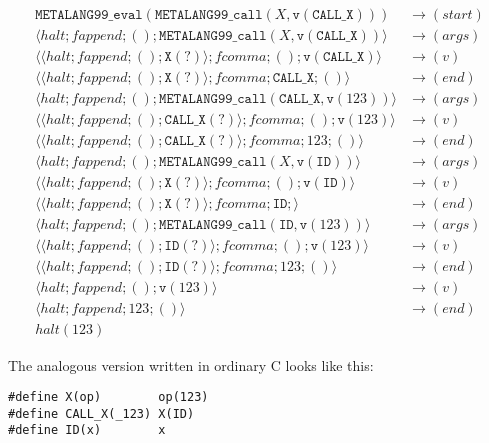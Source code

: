 \documentclass[12pt]{article}
\theoremstyle{break}
\begin{document}
\begin{example}
\begin{align*}
    \texttt{METALANG99\_eval}(\texttt{METALANG99\_call}(X, \texttt{v}(\texttt{CALL\_X}))) & \to (start) \\
    \langle halt; fappend; (); \texttt{METALANG99\_call}(X, \texttt{v}(\texttt{CALL\_X})) \rangle & \to (args) \\
    \langle \langle halt; fappend; (); \texttt{X}(?) \rangle; fcomma; (); \texttt{v}(\texttt{CALL\_X}) \rangle & \to (v) \\
    \langle \langle halt; fappend; (); \texttt{X}(?) \rangle; fcomma; \texttt{CALL\_X}; () \rangle & \to (end) \\
    \langle halt; fappend; (); \texttt{METALANG99\_call}(\texttt{CALL\_X}, \texttt{v}(123)) \rangle & \to (args) \\
    \langle \langle halt; fappend; (); \texttt{CALL\_X}(?) \rangle; fcomma; (); \texttt{v}(123) \rangle & \to (v) \\
    \langle \langle halt; fappend; (); \texttt{CALL\_X}(?) \rangle; fcomma; 123; () \rangle & \to (end) \\
    \langle halt; fappend; (); \texttt{METALANG99\_call}(X, \texttt{v}(\texttt{ID})) \rangle & \to (args) \\
    \langle \langle halt; fappend; (); \texttt{X}(?) \rangle; fcomma; (); \texttt{v}(\texttt{ID}) \rangle & \to (v) \\
    \langle \langle halt; fappend; (); \texttt{X}(?) \rangle; fcomma; \texttt{ID}; \rangle & \to (end) \\
    \langle halt; fappend; (); \texttt{METALANG99\_call}(\texttt{ID}, \texttt{v}(123)) \rangle & \to (args) \\
    \langle \langle halt; fappend; (); \texttt{ID}(?) \rangle; fcomma; (); \texttt{v}(123) \rangle & \to (v) \\
    \langle \langle halt; fappend; (); \texttt{ID}(?) \rangle; fcomma; 123; () \rangle & \to (end) \\
    \langle halt; fappend; (); \texttt{v}(123) \rangle & \to (v) \\
    \langle halt; fappend; 123; () \rangle & \to (end) \\
    halt(123) &
\end{align*}
\end{example}

The analogous version written in ordinary C looks like this:

\begin{verbatim}
#define X(op)        op(123)
#define CALL_X(_123) X(ID)
#define ID(x)        x
\end{verbatim}
\end{document}
